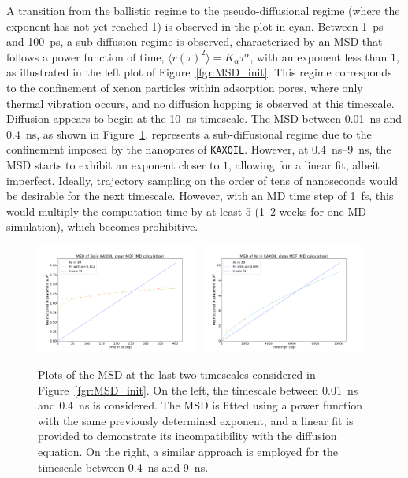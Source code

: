 \documentclass[main]{subfiles}
\begin{document}
A transition from the ballistic regime to the pseudo-diffusional regime (where the exponent has not yet reached 1) is observed in the plot in cyan. Between \SI{1}{\ps} and \SI{100}{\ps}, a sub-diffusion regime is observed, characterized by an MSD that follows a power function of time, $\langle {r(\tau)}^2 \rangle=K_\alpha\tau^\alpha$, with an exponent less than $1$, as illustrated in the left plot of Figure~\ref{fgr:MSD_init}. This regime corresponds to the confinement of xenon particles within adsorption pores, where only thermal vibration occurs, and no diffusion hopping is observed at this timescale. Diffusion appears to begin at the \SI{10}{\ns} timescale. The MSD between \SI{0.01}{\ns} and \SI{0.4}{\ns}, as shown in Figure~\ref{fgr:MSD_linear_init}, represents a sub-diffusional regime due to the confinement imposed by the nanopores of \texttt{KAXQIL}. However, at \SI{0.4}{\ns}--\SI{9}{\ns}, the MSD starts to exhibit an exponent closer to $1$, allowing for a linear fit, albeit imperfect. Ideally, trajectory sampling on the order of tens of nanoseconds would be desirable for the next timescale. However, with an MD time step of \SI{1}{\fs}, this would multiply the computation time by at least 5 (1--2 weeks for one MD simulation), which becomes prohibitive.

\begin{figure}[ht]
  \centering
\includegraphics[width=0.48\textwidth]{figures/5-diffusion/MSD_Xe_coeff_KAXQIL_clean_1.pdf}
\includegraphics[width=0.48\textwidth]{figures/5-diffusion/MSD_Xe_coeff_KAXQIL_clean_2.pdf}
\caption{ Plots of the MSD at the last two timescales considered in Figure~\ref{fgr:MSD_init}. On the left, the timescale between \SI{0.01}{\ns} and \SI{0.4}{\ns} is considered. The MSD is fitted using a power function with the same previously determined exponent, and a linear fit is provided to demonstrate its incompatibility with the diffusion equation. On the right, a similar approach is employed for the timescale between \SI{0.4}{\ns} and \SI{9}{\ns}. }\label{fgr:MSD_linear_init}
\end{figure}
\end{document}
